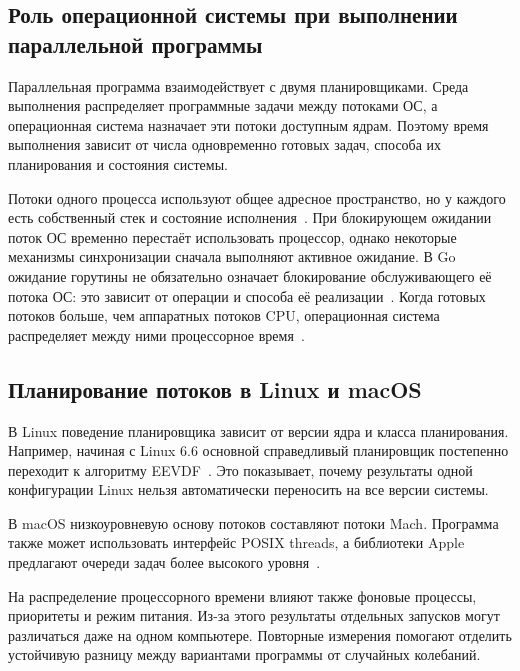 \subsection{Роль операционной системы при выполнении параллельной программы}
\label{subsec:os-role}

Параллельная программа взаимодействует с двумя планировщиками. Среда выполнения распределяет
  программные задачи между потоками ОС, а операционная система назначает эти потоки доступным
  ядрам. Поэтому время выполнения зависит от числа одновременно готовых задач, способа их
  планирования и состояния системы.

Потоки одного процесса используют общее адресное пространство, но у каждого есть собственный стек
  и состояние исполнения~\cite{apple_threading_guide}. При блокирующем ожидании поток ОС временно
  перестаёт использовать процессор, однако некоторые механизмы синхронизации сначала выполняют
  активное ожидание. В Go ожидание горутины не обязательно означает блокирование обслуживающего
  её потока ОС: это зависит от операции и способа её
  реализации~\cite{go_sync_mutex_source,go_runtime_hacking}. Когда готовых потоков больше,
  чем аппаратных потоков CPU, операционная система распределяет между ними процессорное
  время~\cite{apple_threading_guide}.

\subsection{Планирование потоков в Linux и macOS}
\label{subsec:os-scheduling}

В Linux поведение планировщика зависит от версии ядра и класса планирования. Например, начиная
  с Linux 6.6 основной справедливый планировщик постепенно переходит к алгоритму
  EEVDF~\cite{linux_eevdf}. Это показывает, почему результаты одной конфигурации Linux нельзя
  автоматически переносить на все версии системы.

В macOS низкоуровневую основу потоков составляют потоки Mach. Программа также может использовать
  интерфейс POSIX threads, а библиотеки Apple предлагают очереди задач более высокого
  уровня~\cite{apple_threading_guide}.
  

На распределение процессорного времени влияют также фоновые процессы, приоритеты и режим питания. Из-за
  этого результаты отдельных запусков могут различаться даже на одном компьютере. Повторные
  измерения помогают отделить устойчивую разницу между вариантами программы от случайных колебаний.

